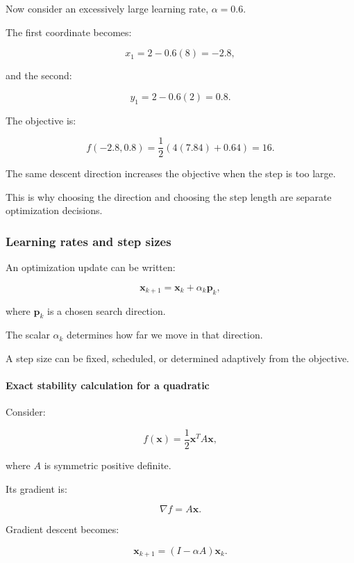 Now consider an excessively large learning rate, \(\alpha=0.6\).

The first coordinate becomes:

\[
x_1=2-0.6(8)=-2.8,
\]

and the second:

\[
y_1=2-0.6(2)=0.8.
\]

The objective is:

\[
f(-2.8,0.8) = \frac12(4(7.84)+0.64) =\boxed{16}.
\]

The same descent direction increases the objective when the step is too large.

This is why choosing the direction and choosing the step length are separate optimization decisions.

\subsubsection{Learning rates and step sizes}\label{02-foundations-ii-ch026-learning-rates-and-step-sizes}

\hypertarget{02-foundations-ii-ch026-learning-rates-and-step-sizes}{}

An optimization update can be written:

\[
\mathbf x_{k+1}=\mathbf x_k+\alpha_k\mathbf p_k,
\]

where \(\mathbf p_k\) is a chosen search direction.

The scalar \(\alpha_k\) determines how far we move in that direction.

A step size can be fixed, scheduled, or determined adaptively from the objective.

\paragraph{Exact stability calculation for a quadratic}\label{02-foundations-ii-ch026-exact-stability-calculation-for-a-quadratic}

\hypertarget{02-foundations-ii-ch026-exact-stability-calculation-for-a-quadratic}{}

Consider:

\[
f(\mathbf x)=\frac12\mathbf x^TA\mathbf x,
\]

where \(A\) is symmetric positive definite.

Its gradient is:

\[
\nabla f=A\mathbf x.
\]

Gradient descent becomes:

\[
\mathbf x_{k+1} = (I-\alpha A)\mathbf x_k.
\]

